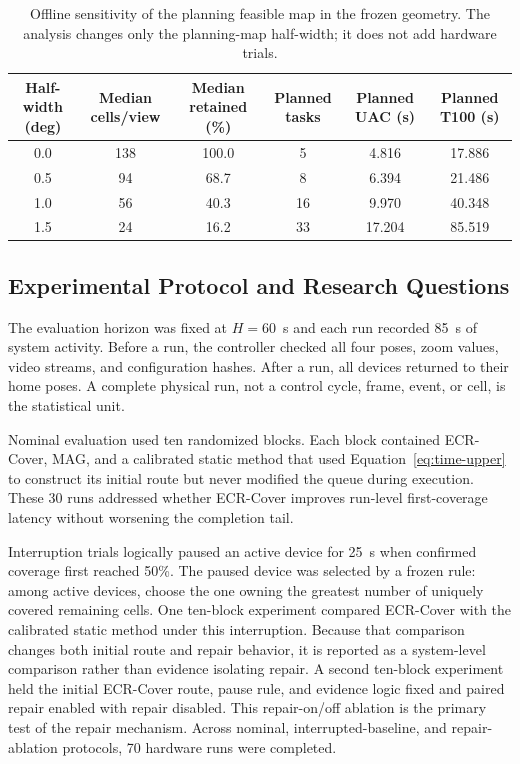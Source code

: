 \begin{table}[t]
\caption{Offline sensitivity of the planning feasible map in the frozen geometry. The analysis changes only the planning-map half-width; it does not add hardware trials.}\label{tab:core-sensitivity}
\centering
\begin{tabular}{cccccc}
\toprule
Half-width (deg) & Median cells/view & Median retained (\%) & Planned tasks & Planned UAC (s) & Planned T100 (s)\\
\midrule
0.0 & 138 & 100.0 & 5  & 4.816  & 17.886\\
0.5 & 94  & 68.7  & 8  & 6.394  & 21.486\\
1.0 & 56  & 40.3  & 16 & 9.970  & 40.348\\
1.5 & 24  & 16.2  & 33 & 17.204 & 85.519\\
\bottomrule
\end{tabular}
\end{table}

\subsection{Experimental Protocol and Research Questions}

The evaluation horizon was fixed at $H=60$~s and each run recorded 85~s of system activity. Before a run, the controller checked all four poses, zoom values, video streams, and configuration hashes. After a run, all devices returned to their home poses. A complete physical run, not a control cycle, frame, event, or cell, is the statistical unit.

Nominal evaluation used ten randomized blocks. Each block contained ECR-Cover, MAG, and a calibrated static method that used Equation~\eqref{eq:time-upper} to construct its initial route but never modified the queue during execution. These 30 runs addressed whether ECR-Cover improves run-level first-coverage latency without worsening the completion tail.

Interruption trials logically paused an active device for 25~s when confirmed coverage first reached 50\%. The paused device was selected by a frozen rule: among active devices, choose the one owning the greatest number of uniquely covered remaining cells. One ten-block experiment compared ECR-Cover with the calibrated static method under this interruption. Because that comparison changes both initial route and repair behavior, it is reported as a system-level comparison rather than evidence isolating repair. A second ten-block experiment held the initial ECR-Cover route, pause rule, and evidence logic fixed and paired repair enabled with repair disabled. This repair-on/off ablation is the primary test of the repair mechanism. Across nominal, interrupted-baseline, and repair-ablation protocols, 70 hardware runs were completed.

